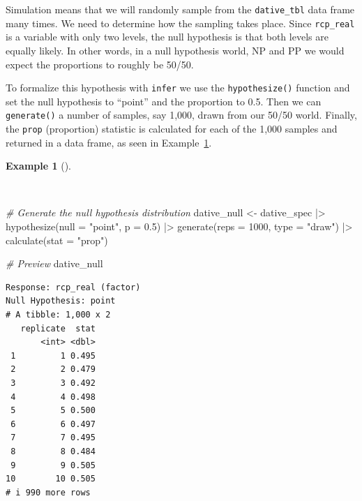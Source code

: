 \documentclass[
  letterpaper,
]{latex/krantz}
\newenvironment{Shaded}{\begin{snugshade}}{\end{snugshade}}
\newcommand{\AttributeTok}[1]{\textcolor[rgb]{0.00,0.00,0.00}{#1}}
\newcommand{\CommentTok}[1]{\textcolor[rgb]{0.00,0.00,0.00}{\textit{#1}}}
\newcommand{\DecValTok}[1]{\textcolor[rgb]{0.00,0.00,0.00}{#1}}
\newcommand{\FloatTok}[1]{\textcolor[rgb]{0.00,0.00,0.00}{#1}}
\newcommand{\FunctionTok}[1]{\textcolor[rgb]{0.00,0.00,0.00}{#1}}
\newcommand{\NormalTok}[1]{\textcolor[rgb]{0.00,0.00,0.00}{#1}}
\newcommand{\OtherTok}[1]{\textcolor[rgb]{0.00,0.00,0.00}{#1}}
\newcommand{\SpecialCharTok}[1]{\textcolor[rgb]{0.00,0.00,0.00}{#1}}
\newcommand{\StringTok}[1]{\textcolor[rgb]{0.00,0.00,0.00}{#1}}
\theoremstyle{definition}
\newtheorem{example}{Example}[chapter]
\theoremstyle{remark}
\begin{document}
Simulation means that we will randomly sample from the
\texttt{dative\_tbl} data frame many times. We need to determine how the
sampling takes place. Since \texttt{rcp\_real} is a variable with only
two levels, the null hypothesis is that both levels are equally likely.
In other words, in a null hypothesis world, NP and PP we would expect
the proportions to roughly be 50/50.

To formalize this hypothesis with \texttt{infer} we use the
\texttt{hypothesize()} function and set the null hypothesis to ``point''
and the proportion to 0.5. Then we can \texttt{generate()} a number of
samples, say 1,000, drawn from our 50/50 world. Finally, the
\texttt{prop} (proportion) statistic is calculated for each of the 1,000
samples and returned in a data frame, as seen in
Example~\ref{exm-infer-cat-null-hypothesis}.

\begin{example}[]\protect\hypertarget{exm-infer-cat-null-hypothesis}{}\label{exm-infer-cat-null-hypothesis}

~

\begin{Shaded}
\begin{Highlighting}[]
\CommentTok{\# Generate the null hypothesis distribution}
\NormalTok{dative\_null }\OtherTok{\textless{}{-}}
\NormalTok{  dative\_spec }\SpecialCharTok{|\textgreater{}}
  \FunctionTok{hypothesize}\NormalTok{(}\AttributeTok{null =} \StringTok{"point"}\NormalTok{, }\AttributeTok{p =} \FloatTok{0.5}\NormalTok{) }\SpecialCharTok{|\textgreater{}}
  \FunctionTok{generate}\NormalTok{(}\AttributeTok{reps =} \DecValTok{1000}\NormalTok{, }\AttributeTok{type =} \StringTok{"draw"}\NormalTok{) }\SpecialCharTok{|\textgreater{}}
  \FunctionTok{calculate}\NormalTok{(}\AttributeTok{stat =} \StringTok{"prop"}\NormalTok{)}

\CommentTok{\# Preview}
\NormalTok{dative\_null}
\end{Highlighting}
\end{Shaded}

\begin{verbatim}
Response: rcp_real (factor)
Null Hypothesis: point
# A tibble: 1,000 x 2
   replicate  stat
       <int> <dbl>
 1         1 0.495
 2         2 0.479
 3         3 0.492
 4         4 0.498
 5         5 0.500
 6         6 0.497
 7         7 0.495
 8         8 0.484
 9         9 0.505
10        10 0.505
# i 990 more rows
\end{verbatim}

\end{example}
\end{document}
